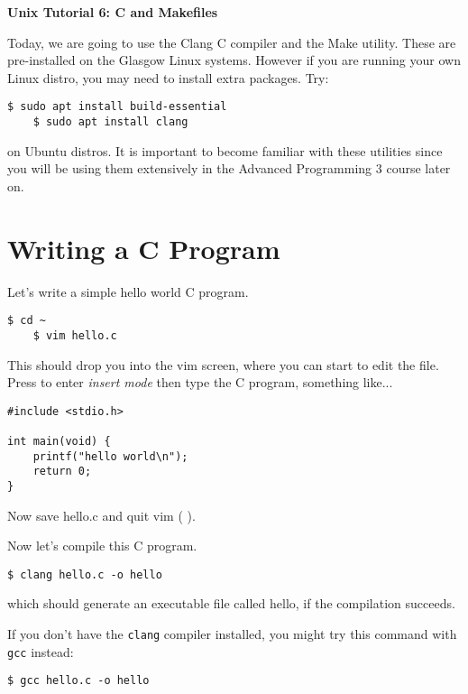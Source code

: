\documentclass{article}
\begin{document}
\noindent
{\Large \textsf{\textbf{Unix Tutorial 6: C and Makefiles}}}

\bigskip


Today, we are going to use the Clang C compiler and the Make utility. These are pre-installed on the Glasgow Linux systems. However if you are running your own Linux distro, you may need to install extra packages. Try:
\begin{lstlisting}[style=BashInputStyle]
    $ sudo apt install build-essential
    $ sudo apt install clang
\end{lstlisting}
on Ubuntu distros.
It is important to become familiar with these utilities since you will be using them extensively in the Advanced Programming 3 course later on.

\section*{Writing a C Program}

Let's write a simple hello world C program.

\begin{lstlisting}[style=BashInputStyle]
    $ cd ~
    $ vim hello.c
\end{lstlisting}

This should drop you into the vim screen, where you can start to edit the file. Press  to enter \textit{insert mode} then type the C program, something like...

\begin{lstlisting}[style=CeeProg]
#include <stdio.h>

int main(void) {
    printf("hello world\n");
    return 0;
}
\end{lstlisting}

Now save hello.c and quit vim (\keys{\esc} \keys{:}   \keys{\enter}).

Now let's compile this C program. 
\begin{lstlisting}[style=BashInputStyle]
    $ clang hello.c -o hello
\end{lstlisting}
which should generate an executable file called hello, if the compilation succeeds.

If you don't have the \texttt{clang} compiler installed, you might try this command with \texttt{gcc} instead:

\begin{lstlisting}[style=BashInputStyle]
    $ gcc hello.c -o hello
\end{lstlisting}
\end{document}
